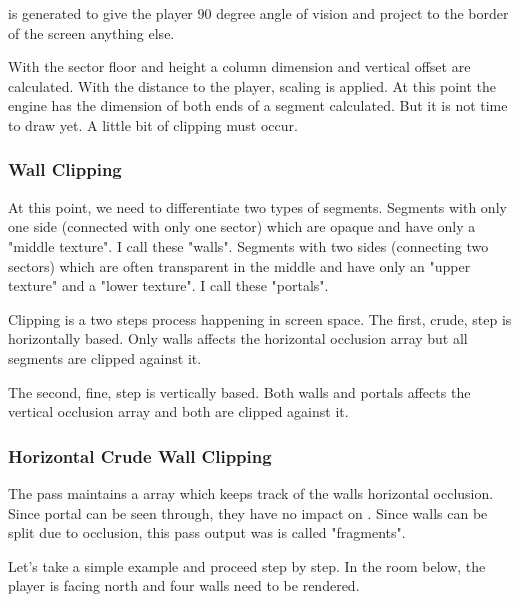\par
{} is generated to give the player 90 degree angle of vision and project to the border of the screen anything else. 
\par
{}
\par
With the sector floor and height a column dimension and vertical offset are calculated. With the distance to the player, scaling is applied. At this point the engine has the dimension of both ends of a segment calculated. But it is not time to draw yet. A little bit of clipping must occur. 






\subsubsection{Wall Clipping}
At this point, we need to differentiate two types of segments. Segments with only one side (connected with only one sector) which are opaque and have only a "middle texture". I call these "walls". Segments with two sides (connecting two sectors) which are often transparent in the middle and have only an "upper texture" and a "lower texture". I call these "portals".\\
\par
Clipping is a two steps process happening in screen space. The first, crude, step is horizontally based. Only walls affects the horizontal occlusion array but all segments are clipped against it.\\
\par
The second, fine, step is vertically based. Both walls and portals affects the vertical occlusion array and both are clipped against it.\\
\par
\pagebreak

\subsubsection{Horizontal Crude Wall Clipping}
The pass maintains a  array which keeps track of the walls horizontal occlusion. Since portal can be seen through, they have no impact on . Since walls can be split due to occlusion, this pass output was is called "fragments".\\
\par
{}
\par
Let's take a simple example and proceed step by step. In the room below, the player is facing north and four walls need to be rendered.
\par
{}
\par

